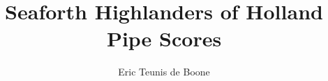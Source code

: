 \documentclass{tex/score_book}
\title{Seaforth Highlanders of Holland\\Pipe Scores}
\author{Eric Teunis de Boone}
\begin{document}


\newpage
\cleardoublepage
{}
{}
\begin{multicols}{2}
  \tableofcontents
\end{multicols}

%
\newpage

\end{document}
